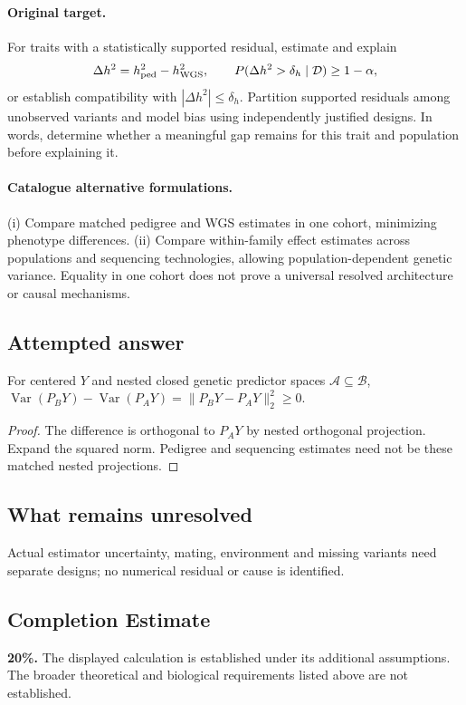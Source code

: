 \documentclass[11pt]{article}
\begin{document}
\paragraph{Original target.}
For traits with a statistically supported residual, estimate and explain
\[
\Delta h^2=h_{\rm ped}^2-h_{\rm WGS}^2,
\qquad P(\Delta h^2>\delta_h\mid\mathcal D)\geq1-\alpha,
\]
or establish compatibility with $|\Delta h^2|\leq\delta_h$. Partition supported residuals among unobserved variants and model bias using independently justified designs. In words, determine whether a meaningful gap remains for this trait and population before explaining it.
\paragraph{Catalogue alternative formulations.}
(i) Compare matched pedigree and WGS estimates in one cohort, minimizing phenotype differences. (ii) Compare within-family effect estimates across populations and sequencing technologies, allowing population-dependent genetic variance. Equality in one cohort does not prove a universal resolved architecture or causal mechanisms.
\subsection{Attempted answer}
\begin{proposition}
For centered $Y$ and nested closed genetic predictor spaces $\mathcal A\subseteq\mathcal B$, $\operatorname{Var}(P_BY)-\operatorname{Var}(P_AY)=\|P_BY-P_AY\|_2^2\geq0$.
\end{proposition}
\begin{proof}
The difference is orthogonal to $P_AY$ by nested orthogonal projection. Expand the squared norm. Pedigree and sequencing estimates need not be these matched nested projections.
\end{proof}
\subsection{What remains unresolved}
Actual estimator uncertainty, mating, environment and missing variants need separate designs; no numerical residual or cause is identified.
\subsection{Completion Estimate}
\textbf{20\%.} The displayed calculation is established under its additional assumptions. The broader theoretical and biological requirements listed above are not established.
\end{document}
